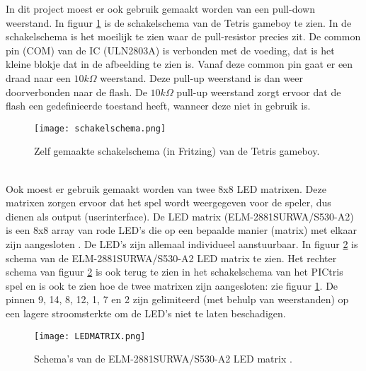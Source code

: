 In dit project moest er ook gebruik gemaakt worden van een pull-down weerstand. In figuur \ref{fig:schakelcircuit} is de schakelschema van de Tetris gameboy te zien. 
In de schakelschema is het moeilijk te zien waar de pull-resistor precies zit. De common pin (COM) van de IC (ULN2803A) is verbonden met de voeding, dat is het kleine blokje dat in de afbeelding te zien is. 
Vanaf deze common pin gaat er een draad naar een $10k\Omega$ weerstand. Deze pull-up weerstand is dan weer doorverbonden naar de flash. 
De $10k\Omega$ pull-up weerstand zorgt ervoor dat de flash een gedefinieerde toestand heeft, wanneer deze niet in gebruik is. 
\begin{figure}[h]
    \centering
    \texttt{[image: schakelschema.png]}
    \caption{Zelf gemaakte schakelschema (in Fritzing) van de Tetris gameboy.}
    \label{fig:schakelcircuit}
    \end{figure}\\
Ook moest er gebruik gemaakt worden van twee 8x8 LED matrixen. Deze matrixen zorgen ervoor dat het spel wordt weergegeven voor de speler, dus dienen als output (userinterface). 
De LED matrix (ELM-2881SURWA/S530-A2) is een 8x8 array van rode LED's die op een bepaalde manier (matrix) met elkaar zijn aangesloten \cite{Everlight_ELM2881SURWA}. De LED's zijn allemaal individueel aanstuurbaar.  
In figuur \ref{fig:LEDMATRIX} is schema van de ELM-2881SURWA/S530-A2 LED matrix te zien. Het rechter schema van figuur \ref{fig:LEDMATRIX} is ook terug te zien in het schakelschema van het PICtris spel en is ook te zien hoe de twee matrixen zijn aangesloten: zie figuur \ref{fig:schakelcircuit}. 
De pinnen 9, 14, 8, 12, 1, 7 en 2 zijn gelimiteerd (met behulp van weerstanden) op een lagere stroomsterkte om de LED's niet te laten beschadigen. 
\begin{figure}[h]
    \centering
    \texttt{[image: LEDMATRIX.png]}
    \caption{Schema's van de ELM-2881SURWA/S530-A2 LED matrix \cite{Everlight_ELM2881SURWA}.}
    \label{fig:LEDMATRIX}
    \end{figure}\\

